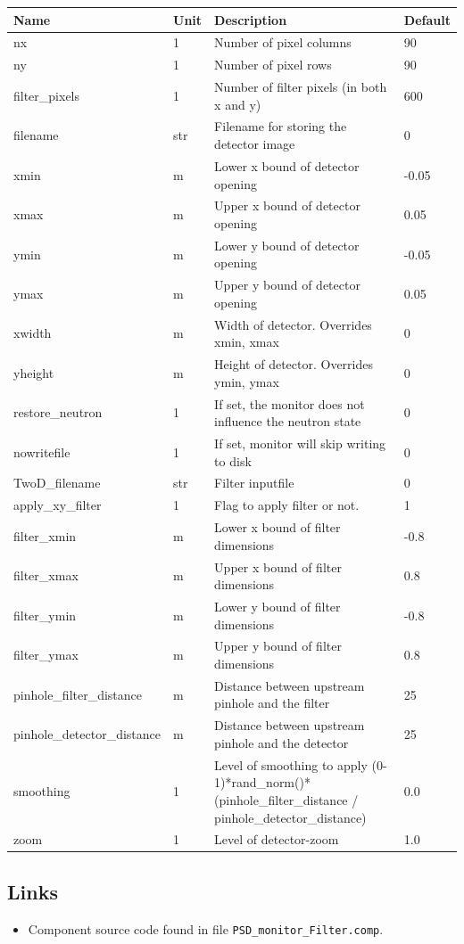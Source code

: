 \begin{longtable}{p{}p{}p{}p{}}
\toprule
\textbf{Name} & \textbf{Unit} & \textbf{Description} & \textbf{Default} \\
\midrule
\endhead
nx & 1 & Number of pixel columns & 90 \\
ny & 1 & Number of pixel rows & 90 \\
filter\_pixels & 1 & Number of filter pixels (in both x and y) & 600 \\
filename & str & Filename for storing the detector image & 0 \\
xmin & m & Lower x bound of detector opening & -0.05 \\
xmax & m & Upper x bound of detector opening & 0.05 \\
ymin & m & Lower y bound of detector opening & -0.05 \\
ymax & m & Upper y bound of detector opening & 0.05 \\
xwidth & m & Width of detector. Overrides xmin, xmax & 0 \\
yheight & m & Height of detector. Overrides ymin, ymax & 0 \\
restore\_neutron & 1 & If set, the monitor does not influence the neutron state & 0 \\
nowritefile & 1 & If set, monitor will skip writing to disk & 0 \\
TwoD\_filename & str & Filter inputfile & 0 \\
apply\_xy\_filter & 1 & Flag to apply filter or not. & 1 \\
filter\_xmin & m & Lower x bound of filter dimensions & -0.8 \\
filter\_xmax & m & Upper x bound of filter dimensions & 0.8 \\
filter\_ymin & m & Lower y bound of filter dimensions & -0.8 \\
filter\_ymax & m & Upper y bound of filter dimensions & 0.8 \\
pinhole\_filter\_distance & m & Distance between upstream pinhole and the filter & 25 \\
pinhole\_detector\_distance & m & Distance between upstream pinhole and the detector & 25 \\
smoothing & 1 & Level of smoothing to apply (0-1)*rand\_norm()*(pinhole\_filter\_distance / pinhole\_detector\_distance) & 0.0 \\
zoom & 1 & Level of detector-zoom & 1.0 \\
\bottomrule
\end{longtable}

\subsection*{Links}
\begin{itemize}
  \item Component source code found in file \texttt{PSD\_monitor\_Filter.comp}.
\end{itemize}
